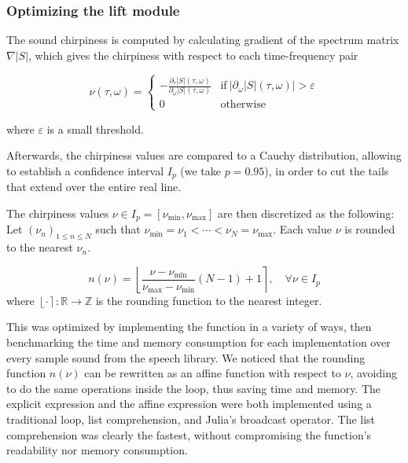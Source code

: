 \documentclass[american,]{article}
\theoremstyle{definition}
\theoremstyle{definition}
\theoremstyle{definition}
\theoremstyle{remark}
\begin{document}
\hypertarget{optimizing-the-lift-module}{%
\subsubsection{Optimizing the lift module}\label{optimizing-the-lift-module}}

The sound chirpiness is computed by calculating gradient of the spectrum matrix \(\nabla\left\lvert S\right\rvert\),
which gives the chirpiness with respect to each time-frequency pair

\begin{equation}
\nu(\tau,\omega) =
\begin{cases}
-\frac{\partial_\tau\left\lvert S\right\rvert(\tau,\omega)}{\partial_\omega\left\lvert S\right\rvert(\tau,\omega)} & \text{if}~\left\lvert\partial_\omega\left\lvert S\right\rvert(\tau,\omega)\right\rvert>\varepsilon\\
0 & \text{otherwise}
\end{cases}
\end{equation}

where \(\varepsilon\) is a small threshold.

Afterwards, the chirpiness values are compared to a Cauchy distribution, allowing to establish
a confidence interval \(I_p\) (we take \(p=0.95\)), in order to cut the tails that extend
over the entire real line.

The chirpiness values \(\nu\in I_p=[\nu_{\min},\nu_{\max}]\) are then discretized as the following:
Let \((\nu_n)_{1\leq n\leq N}\) such that \(\nu_{\min}=\nu_1<\cdots<\nu_N=\nu_{\max}\).
Each value \(\nu\) is rounded to the nearest \(\nu_n\).

\begin{equation}
n(\nu) = \left\lfloor\frac{\nu - \nu_{\min}}{\nu_{\max}- \nu_{\min}}(N-1) + 1\right\rceil,\quad\forall\nu\in I_p
\end{equation}
where \(\left\lfloor\cdot\right\rceil:\mathbb{R}\rightarrow\mathbb{Z}\) is the rounding function to the nearest integer.

This was optimized by implementing the function in a variety of ways,
then benchmarking the time and memory consumption for each implementation
over every sample sound from the speech library.
We noticed that the rounding function \(n(\nu)\) can be rewritten
as an affine function with respect to \(\nu\), avoiding to do the same
operations inside the loop, thus saving time and memory.
The explicit expression and the affine expression were both implemented
using a traditional loop, list comprehension, and Julia's broadcast operator.
The list comprehension was clearly the fastest, without compromising
the function's readability nor memory consumption.
\end{document}
